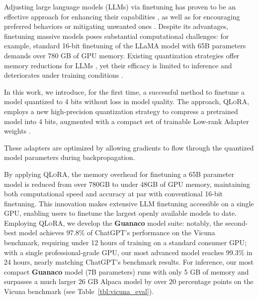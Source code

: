Adjusting large language models (LLMs) via finetuning has proven to be an effective approach for enhancing their capabilities \citep{min2021metaicl, wei2021finetuned, ouyang2022training, wang2022super, wang2022self, liu2022few}, as well as for encouraging preferred behaviors or mitigating unwanted ones \citep{ouyang2022training,askell2021general,bai2022training}. Despite its advantages, finetuning massive models poses substantial computational challenges: for example, standard 16-bit finetuning of the LLaMA model with 65B parameters~\citep{touvron2023llama} demands over 780 GB of GPU memory. Existing quantization strategies offer memory reductions for LLMs \citep{dettmers2022llm, dettmers2022case, frantar2022gptq, xiao2022smoothquant}, yet their efficacy is limited to inference and deteriorates under training conditions \citep{wortsman2023stable}.

In this work, we introduce, for the first time, a successful method to finetune a model quantized to 4 bits without loss in model quality. The approach, \textsc{QLoRA}, employs a new high-precision quantization strategy to compress a pretrained model into 4 bits, augmented with a compact set of trainable Low-rank Adapter weights \citep{hu2021lora}. 

These adapters are optimized by allowing gradients to flow through the quantized model parameters during backpropagation.

By applying \textsc{QLoRA}, the memory overhead for finetuning a 65B parameter model is reduced from over 780GB to under 48GB of GPU memory, maintaining both computational speed and accuracy at par with conventional 16-bit finetuning. This innovation makes extensive LLM finetuning accessible on a single GPU, enabling users to finetune the largest openly available models to date. Employing \textsc{QLoRA}, we develop the \textbf{Guanaco} model suite: notably, the second-best model achieves 97.8\% of ChatGPT's performance on the Vicuna~\citep{vicuna2023} benchmark, requiring under 12 hours of training on a standard consumer GPU; with a single professional-grade GPU, our most advanced model reaches 99.3\% in 24 hours, nearly matching ChatGPT's benchmark results. For inference, our most compact \textbf{Guanaco} model (7B parameters) runs with only 5 GB of memory and surpasses a much larger 26 GB Alpaca model by over 20 percentage points on the Vicuna benchmark (see Table~\ref{tbl:vicuna_eval}).

